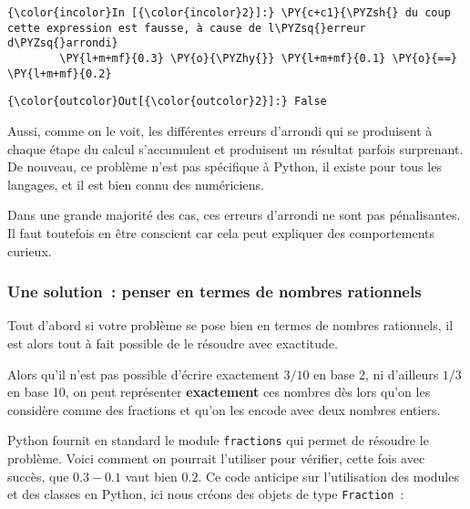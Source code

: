    \begin{Verbatim}[commandchars=\\\{\},frame=single,framerule=0.3mm,rulecolor=\color{cellframecolor}]
{\color{incolor}In [{\color{incolor}2}]:} \PY{c+c1}{\PYZsh{} du coup cette expression est fausse, à cause de l\PYZsq{}erreur d\PYZsq{}arrondi}
        \PY{l+m+mf}{0.3} \PY{o}{\PYZhy{}} \PY{l+m+mf}{0.1} \PY{o}{==} \PY{l+m+mf}{0.2}
\end{Verbatim}


\begin{Verbatim}[commandchars=\\\{\},frame=single,framerule=0.3mm,rulecolor=\color{cellframecolor}]
{\color{outcolor}Out[{\color{outcolor}2}]:} False
\end{Verbatim}
            
    Aussi, comme on le voit, les différentes erreurs d'arrondi qui se
produisent à chaque étape du calcul s'accumulent et produisent un
résultat parfois surprenant. De nouveau, ce problème n'est pas
spécifique à Python, il existe pour tous les langages, et il est bien
connu des numériciens.

    Dans une grande majorité des cas, ces erreurs d'arrondi ne sont pas
pénalisantes. Il faut toutefois en être conscient car cela peut
expliquer des comportements curieux.

    \hypertarget{une-solution-penser-en-termes-de-nombres-rationnels}{%
\subsubsection{Une solution~: penser en termes de nombres
rationnels}\label{une-solution-penser-en-termes-de-nombres-rationnels}}

    Tout d'abord si votre problème se pose bien en termes de nombres
rationnels, il est alors tout à fait possible de le résoudre avec
exactitude.

    Alors qu'il n'est pas possible d'écrire exactement \(3/10\) en base 2,
ni d'ailleurs \(1/3\) en base 10, on peut représenter
\textbf{exactement} ces nombres dès lors qu'on les considère comme des
fractions et qu'on les encode avec deux nombres entiers.

    Python fournit en standard le module \texttt{fractions} qui permet de
résoudre le problème. Voici comment on pourrait l'utiliser pour
vérifier, cette fois avec succès, que \(0.3 - 0.1\) vaut bien \(0.2\).
Ce code anticipe sur l'utilisation des modules et des classes en Python,
ici nous créons des objets de type \texttt{Fraction}~:

